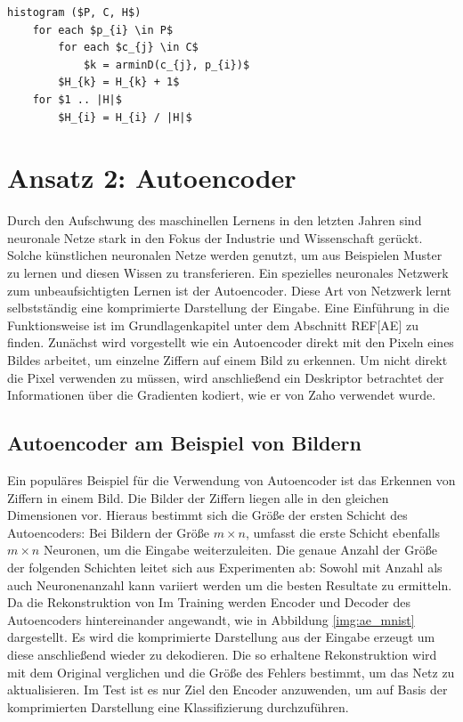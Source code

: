 
\begin{lstlisting}[mathescape=true]
histogram ($P, C, H$)
	for each $p_{i} \in P$
		for each $c_{j} \in C$
			$k = arminD(c_{j}, p_{i})$ 
		$H_{k} = H_{k} + 1$		
	for $1 .. |H|$
		$H_{i} = H_{i} / |H|$
\end{lstlisting}

\section{Ansatz 2: Autoencoder}

Durch den Aufschwung des maschinellen Lernens in den letzten Jahren sind neuronale Netze stark in den Fokus der Industrie und Wissenschaft gerückt. Solche künstlichen neuronalen Netze werden genutzt, um aus Beispielen Muster zu lernen und diesen Wissen zu transferieren. 
Ein spezielles neuronales Netzwerk zum unbeaufsichtigten Lernen ist der Autoencoder. Diese Art von Netzwerk lernt selbstständig eine komprimierte Darstellung der Eingabe. Eine Einführung in die Funktionsweise ist im Grundlagenkapitel unter dem Abschnitt REF[AE] zu finden.
Zunächst wird vorgestellt wie ein Autoencoder direkt mit den Pixeln eines Bildes arbeitet, um einzelne Ziffern auf einem Bild zu erkennen. Um nicht direkt die Pixel verwenden zu müssen, wird anschließend ein Deskriptor betrachtet der Informationen über die Gradienten kodiert, wie er von Zaho \cite{aed2016} verwendet wurde.

\subsection{Autoencoder am Beispiel von Bildern}

Ein populäres Beispiel für die Verwendung von Autoencoder ist das Erkennen von Ziffern in einem Bild. Die Bilder der Ziffern liegen alle in den gleichen Dimensionen vor. Hieraus bestimmt sich die Größe der ersten Schicht des Autoencoders: Bei Bildern der Größe $m \times n$, umfasst die erste Schicht ebenfalls $m \times n$ Neuronen, um die Eingabe weiterzuleiten. Die genaue Anzahl der Größe der folgenden Schichten leitet sich aus Experimenten ab: Sowohl mit Anzahl als auch Neuronenanzahl kann variiert werden um die besten Resultate zu ermitteln. Da die Rekonstruktion von 
Im Training werden Encoder und Decoder des Autoencoders hintereinander angewandt, wie in Abbildung \ref{img:ae_mnist} dargestellt. Es wird die komprimierte Darstellung aus der Eingabe erzeugt um diese anschließend wieder zu dekodieren. Die so erhaltene Rekonstruktion wird mit dem Original verglichen und die Größe des Fehlers bestimmt, um das Netz zu aktualisieren.
Im Test ist es nur Ziel den Encoder anzuwenden, um auf Basis der komprimierten Darstellung eine Klassifizierung durchzuführen. 

